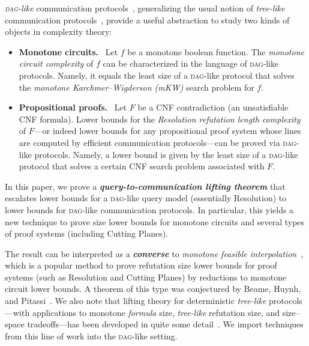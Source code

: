 \documentclass[11pt]{article}
\numberwithin{equation}{section}
\theoremstyle{definition}
\theoremstyle{plain}
\newcommand{\DAG}{\textsc{dag}}
\begin{document}
\emph{\DAG-like} communication protocols~\cite{razborov95unprovability,pudlak10extracting,sokolov17dag}, generalizing the usual notion of \emph{tree-like} communication protocols~\cite{kushilevitz97communication,jukna12boolean,rao17communication}, provide a useful abstraction to study two kinds of objects in complexity theory:
\begin{itemize}[label=$\bullet$,itemsep=3mm]
\item {\bf Monotone circuits.}~
Let $f$ be a monotone boolean function. The \emph{monotone circuit complexity} of $f$ can be characterized in the language of \DAG-like protocols. Namely, it equals the least size of a \DAG-like protocol that solves the \emph{monotone Karchmer--Wigderson (mKW)} search problem for $f$.

\item {\bf Propositional proofs.}~
Let $F$ be a CNF contradiction (an unsatisfiable CNF formula). Lower bounds for the \emph{Resolution refutation length complexity} of $F$---or indeed lower bounds for any propositional proof system whose lines are computed by efficient communication protocols---can be proved via \DAG-like protocols. Namely, a lower bound is given by the least size of a \DAG-like protocol that solves a certain CNF search problem associated with $F$.
\end{itemize}

\noindent
In this paper, we prove a {\bf\itshape query-to-communication lifting theorem} that escalates lower bounds for a \DAG-like query model (essentially Resolution) to lower bounds for \DAG-like communication protocols. In particular, this yields a new technique to prove size lower bounds for monotone circuits and several types of proof systems (including Cutting Planes).

\medskip\noindent
The result can be interpreted as a {\bf\itshape converse} to \emph{monotone feasible interpolation}~\cite{bonet97lower,krajicek97interpolation}, which is a popular method to prove refutation size lower bounds for proof systems (such as Resolution and Cutting Planes) by reductions to monotone circuit lower bounds. A theorem of this type was conjectured by Beame, Huynh, and Pitassi~\cite[\S6]{beame10hardness}. We also note that lifting theory for deterministic \emph{tree-like} protocols---with applications to monotone \emph{formula} size, \emph{tree-like} refutation size, and size--space tradeoffs---has been developed in quite some detail~\cite{raz99separation,huynh12virtue,goos14cbs,goos15deterministic,rezende16limited,wu17raz,chattopadhyay17simulation}. We import techniques from this line of work into the \DAG-like setting.
\end{document}
